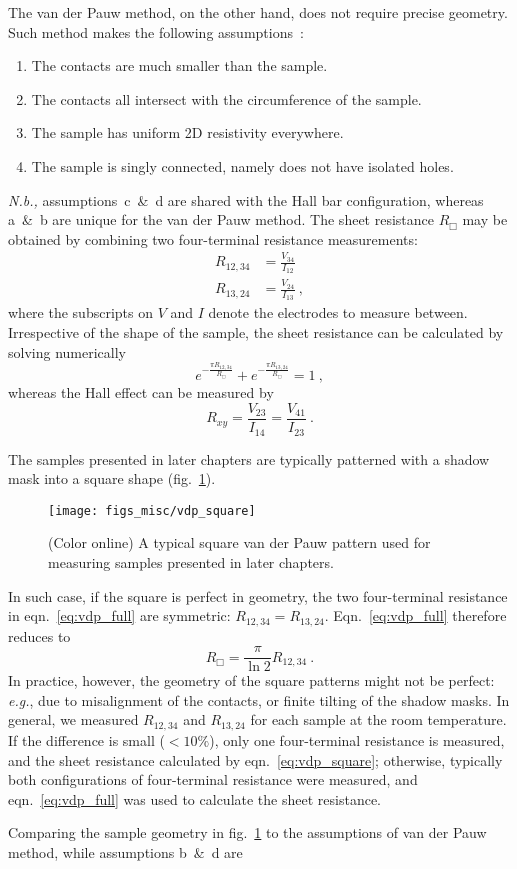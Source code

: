 The van der Pauw method, on the other hand, does not require precise geometry. Such method makes the following assumptions~\cite{VdP1958}:%
\begin{enumerate}[label={\alph*)}]
    \item The contacts are much smaller than the sample.
    \item The contacts all intersect with the circumference of the sample.
    \item The sample has uniform 2D resistivity everywhere.
    \item The sample is singly connected, namely does not have isolated holes.
\end{enumerate}%
\textit{N.b.,} assumptions~c~\&~d are shared with the Hall bar configuration, whereas a~\&~b are unique for the van der Pauw method. The sheet resistance $R_\Box$ may be obtained by combining two four-terminal resistance measurements: %
\begin{align}
    R_{12,34} &= \frac{V_{34}}{I_{12}}\nonumber\\
    R_{13,24} &= \frac{V_{24}}{I_{13}}~,
\end{align}%
where the subscripts on $V$ and $I$ denote the electrodes to measure between. Irrespective of the shape of the sample, the sheet resistance can be calculated by solving numerically%
\begin{equation}\label{eq:vdp_full}
	e^{-\frac{\pi{}R_{12,34}}{R_\Box}} + e^{-\frac{\pi{}R_{13,24}}{R_\Box}} = 1~,
\end{equation}
whereas the Hall effect can be measured by
\begin{equation}\label{eq:vdp_hall}
	R_{xy} = \frac{V_{23}}{I_{14}} = \frac{V_{41}}{I_{23}}~.
\end{equation}

The samples presented in later chapters are typically patterned with a shadow mask into a square shape (fig.~\ref{fig:vdp_square}). %
\begin{figure}[ht]%
	\centering%
    \texttt{[image: figs\_misc/vdp\_square]}%
    \caption[A typical square van der Pauw pattern]{\label{fig:vdp_square}(Color online) A typical square van der Pauw pattern used for measuring samples presented in later chapters.}%
\end{figure}%
In such case, if the square is perfect in geometry, the two four-terminal resistance in eqn.~\ref{eq:vdp_full} are symmetric: $R_{12,34} = R_{13,24}$. Eqn.~\ref{eq:vdp_full} therefore reduces to%
\begin{equation}\label{eq:vdp_square}
	{R_\Box} = \frac{\pi}{\ln{2}}R_{12,34}~.
\end{equation}%
In practice, however, the geometry of the square patterns might not be perfect: \textit{e.g.}, due to misalignment of the contacts, or finite tilting of the shadow masks. In general, we measured $R_{12,34}$ and $R_{13,24}$ for each sample at the room temperature. If the difference is small ($<10\%$), only one four-terminal resistance is measured, and the sheet resistance calculated by eqn.~\ref{eq:vdp_square}; otherwise, typically both configurations of four-terminal resistance were measured, and eqn.~\ref{eq:vdp_full} was used to calculate the sheet resistance.

Comparing the sample geometry in fig.~\ref{fig:vdp_square} to the assumptions of van der Pauw method, while assumptions b~\&~d are 